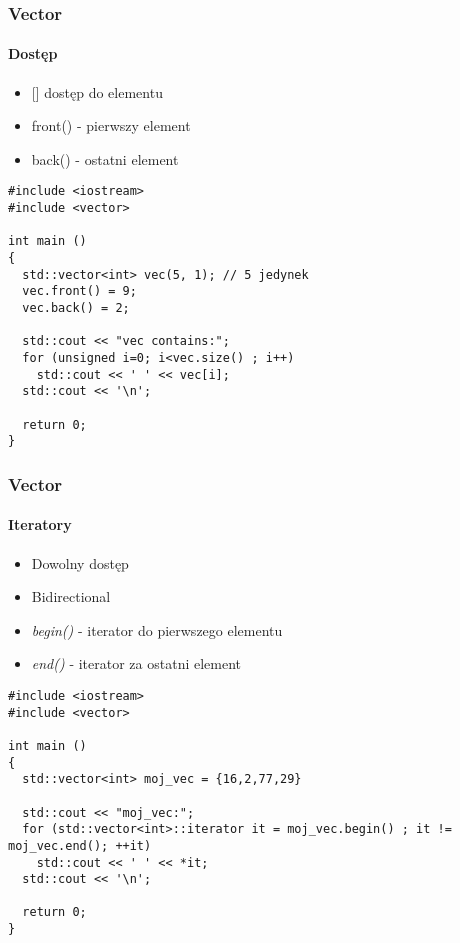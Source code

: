 \documentclass[10pt]{beamer}
\begin{document}
\begin{frame}[fragile]
  \frametitle{Vector}
  \framesubtitle{Dostęp}
  \begin{itemize}
    \item {[]} dostęp do elementu
    \item front() - pierwszy element
    \item back() - ostatni element
  \end{itemize}
  \begin{lstlisting}
#include <iostream>
#include <vector>

int main ()
{
  std::vector<int> vec(5, 1); // 5 jedynek
  vec.front() = 9;
  vec.back() = 2;

  std::cout << "vec contains:";
  for (unsigned i=0; i<vec.size() ; i++)
    std::cout << ' ' << vec[i];
  std::cout << '\n';

  return 0;
}
  \end{lstlisting}
\end{frame}

\begin{frame}[fragile]
  \frametitle{Vector}
  \framesubtitle{Iteratory}
  \begin{itemize}
    \item Dowolny dostęp
    \item Bidirectional
    \item \textit{begin()} - iterator do pierwszego elementu
    \item \textit{end()} - iterator za ostatni element
  \end{itemize}
  \begin{lstlisting}
#include <iostream>
#include <vector>

int main ()
{
  std::vector<int> moj_vec = {16,2,77,29}

  std::cout << "moj_vec:";
  for (std::vector<int>::iterator it = moj_vec.begin() ; it != moj_vec.end(); ++it)
    std::cout << ' ' << *it;
  std::cout << '\n';

  return 0;
}
\end{lstlisting}
\end{frame}
\end{document}
